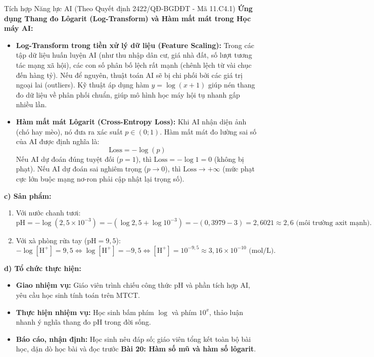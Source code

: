 \documentclass[12pt, a4paper]{article}
\begin{document}
\begin{aibox}{Tích hợp Năng lực AI (Theo Quyết định 2422/QĐ-BGDĐT - Mã 11.C4.1)}
\textbf{Ứng dụng Thang đo Lôgarit (Log-Transform) và Hàm mất mát trong Học máy AI:}
\begin{itemize}[leftmargin=0.6cm]
    \item \textbf{Log-Transform trong tiền xử lý dữ liệu (Feature Scaling):} Trong các tập dữ liệu huấn luyện AI (như thu nhập dân cư, giá nhà đất, số lượt tương tác mạng xã hội), các con số phân bố lệch rất mạnh (chênh lệch từ vài chục đến hàng tỷ). Nếu để nguyên, thuật toán AI sẽ bị chi phối bởi các giá trị ngoại lai (outliers). Kỹ thuật áp dụng hàm $y = \log(x + 1)$ giúp nén thang đo dữ liệu về phân phối chuẩn, giúp mô hình học máy hội tụ nhanh gấp nhiều lần.
    \item \textbf{Hàm mất mát Lôgarit (Cross-Entropy Loss):} Khi AI nhận diện ảnh (chó hay mèo), nó đưa ra xác suất $p \in (0; 1)$. Hàm mất mát đo lường sai số của AI được định nghĩa là:
    $$\text{Loss} = -\log(p)$$
    Nếu AI dự đoán đúng tuyệt đối ($p = 1$), thì $\text{Loss} = -\log 1 = 0$ (không bị phạt). Nếu AI dự đoán sai nghiêm trọng ($p \to 0$), thì $\text{Loss} \to +\infty$ (mức phạt cực lớn buộc mạng nơ-ron phải cập nhật lại trọng số).
\end{itemize}
\end{aibox}

\noindent \textbf{c) Sản phẩm:}
\begin{enumerate}[leftmargin=0.6cm]
    \item Với nước chanh tươi:
    $$\text{pH} = -\log(2{,}5 \times 10^{-3}) = -(\log 2{,}5 + \log 10^{-3}) = -(0{,}3979 - 3) = 2{,}6021 \approx 2{,}6\text{ (môi trường axit mạnh)}.$$
    \item Với xà phòng rửa tay ($\text{pH} = 9{,}5$):
    $$-\log[\text{H}^+] = 9{,}5 \iff \log[\text{H}^+] = -9{,}5 \iff [\text{H}^+] = 10^{-9{,}5} \approx 3{,}16 \times 10^{-10}\text{ (mol/L)}.$$
\end{enumerate}

\noindent \textbf{d) Tổ chức thực hiện:}
\begin{itemize}[leftmargin=0.6cm]
    \item \textbf{Giao nhiệm vụ:} Giáo viên trình chiếu công thức pH và phần tích hợp AI, yêu cầu học sinh tính toán trên MTCT.
    \item \textbf{Thực hiện nhiệm vụ:} Học sinh bấm phím $\log$ và phím $10^x$, thảo luận nhanh ý nghĩa thang đo pH trong đời sống.
    \item \textbf{Báo cáo, nhận định:} Học sinh nêu đáp số; giáo viên tổng kết toàn bộ bài học, dặn dò học bài và đọc trước \textbf{Bài 20: Hàm số mũ và hàm số lôgarit}.
\end{itemize}
\end{document}
